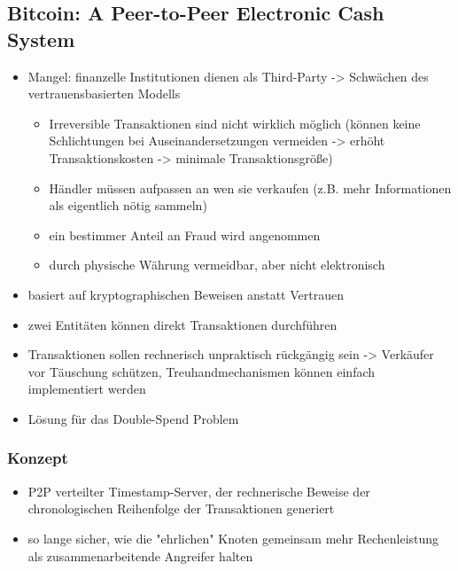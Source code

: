 \subsection*{Bitcoin: A Peer-to-Peer Electronic Cash System}\cite{Nakamoto2008}
    \begin{itemize}
        \item Mangel: finanzelle Institutionen dienen als Third-Party -> Schwächen des vertrauensbasierten Modells
        \begin{itemize}
            \item Irreversible Transaktionen sind nicht wirklich möglich (können keine Schlichtungen bei Auseinandersetzungen vermeiden -> erhöht Transaktionskosten -> minimale Transaktionsgröße)
            \item Händler müssen aufpassen an wen sie verkaufen (z.B. mehr Informationen als eigentlich nötig sammeln)
            \item ein bestimmer Anteil an Fraud wird angenommen
            \item durch physische Währung vermeidbar, aber nicht elektronisch
        \end{itemize}
        \item basiert auf kryptographischen Beweisen anstatt Vertrauen
        \item zwei Entitäten können direkt Transaktionen durchführen
        \item Transaktionen sollen rechnerisch unpraktisch rückgängig sein -> Verkäufer vor Täuschung schützen, Treuhandmechanismen können einfach implementiert werden
        \item Lösung für das Double-Spend Problem
    \end{itemize}

\subsubsection*{Konzept}
    \begin{itemize}
        \item P2P verteilter Timestamp-Server, der rechnerische Beweise der chronologischen Reihenfolge der Transaktionen generiert
        \item so lange sicher, wie die "ehrlichen" Knoten gemeinsam mehr Rechenleistung als zusammenarbeitende Angreifer halten
    \end{itemize}

